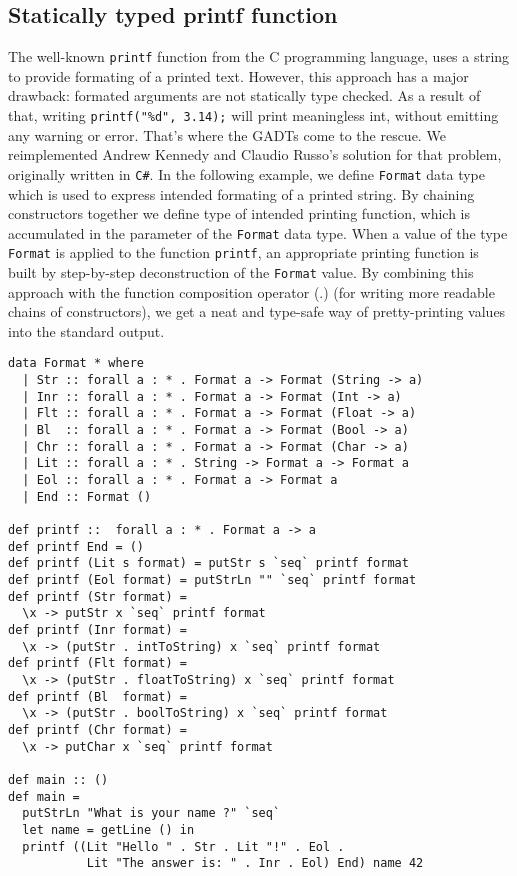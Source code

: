 \documentclass[declaration,shortabstract,english]{iithesis}
\begin{document}
\subsection*{Statically typed printf function}
The well-known \verb+printf+ function from the C programming language,
uses a string to provide formating of a printed text. However, this approach
has a major drawback: formated arguments are not statically type checked.
As a result of that, writing \verb+printf("%d", 3.14);+ will print meaningless int,
without emitting any warning or error. That's where the GADTs come to the rescue.
We reimplemented Andrew Kennedy and Claudio Russo's\cite{gadt-oop} solution for that problem, originally written in \verb+C#+.
In the following example, we define \verb+Format+ data type which is used to express intended formating of a
printed string. By chaining constructors together we define type of intended printing function,
which is accumulated in the parameter of the \verb+Format+ data type. When a value of
the type \verb+Format+ is applied to the function \verb+printf+, an appropriate printing function
is built by step-by-step deconstruction of the \verb+Format+ value. By combining this approach
with the function composition operator (.) (for writing more readable chains of constructors),
we get a neat and type-safe way of pretty-printing values into the standard output.
\begin{verbatim}
data Format * where
  | Str :: forall a : * . Format a -> Format (String -> a)
  | Inr :: forall a : * . Format a -> Format (Int -> a)
  | Flt :: forall a : * . Format a -> Format (Float -> a)
  | Bl  :: forall a : * . Format a -> Format (Bool -> a)
  | Chr :: forall a : * . Format a -> Format (Char -> a)
  | Lit :: forall a : * . String -> Format a -> Format a
  | Eol :: forall a : * . Format a -> Format a
  | End :: Format ()

def printf ::  forall a : * . Format a -> a
def printf End = ()
def printf (Lit s format) = putStr s `seq` printf format
def printf (Eol format) = putStrLn "" `seq` printf format
def printf (Str format) =
  \x -> putStr x `seq` printf format
def printf (Inr format) =
  \x -> (putStr . intToString) x `seq` printf format
def printf (Flt format) =
  \x -> (putStr . floatToString) x `seq` printf format
def printf (Bl  format) =
  \x -> (putStr . boolToString) x `seq` printf format
def printf (Chr format) =
  \x -> putChar x `seq` printf format

def main :: ()
def main =
  putStrLn "What is your name ?" `seq`
  let name = getLine () in
  printf ((Lit "Hello " . Str . Lit "!" . Eol .
           Lit "The answer is: " . Inr . Eol) End) name 42
\end{verbatim}
\end{document}

